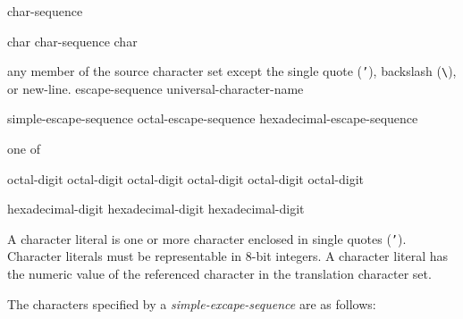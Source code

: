 \begin{grammar}
  \br
   char-sequence 

  \br
  char\br
  char-sequence char

  \br
  \textnormal{any member of the source character set except the single quote
  (\texttt{'}), backslash (\texttt{\textbackslash}), or new-line.}\br
  escape-sequence\br
  universal-character-name

  \br
  simple-escape-sequence\br
  octal-escape-sequence\br
  hexadecimal-escape-sequence

   \textnormal{one of}\br
  \br

  \br
  \terminal{\textbackslash } octal-digit\br
  \terminal{\textbackslash } octal-digit octal-digit\br
  \terminal{\textbackslash } octal-digit octal-digit octal-digit

  \br
   hexadecimal-digit\br
   hexadecimal-digit hexadecimal-digit\br
\end{grammar}

\p A character literal is one or more character enclosed in single quotes
(\texttt{'}). Character literals must be representable in 8-bit integers. A
character literal has the numeric value of the referenced character in the
translation character set.

\p The characters specified by a \textit{simple-excape-sequence} are as follows:

